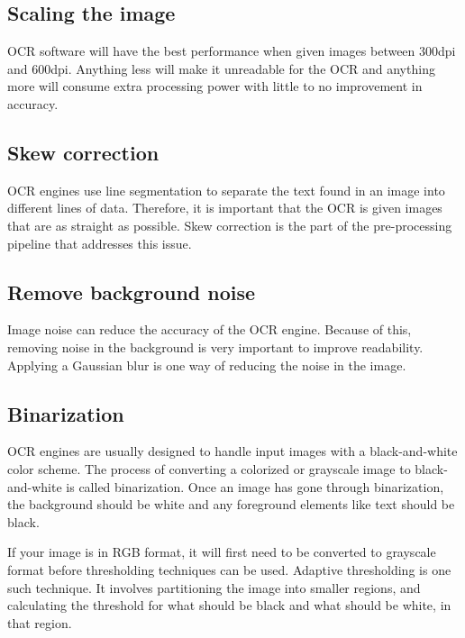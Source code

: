\subsection{Scaling the image}\label{subsec:scaling-the-image}
OCR software will have the best performance when given images between 300dpi and 600dpi.
Anything less will make it unreadable for the OCR and anything more will consume extra processing power with little to no improvement in accuracy.

\subsection{Skew correction}\label{subsec:skew-correction}
OCR engines use line segmentation to separate the text found in an image into different lines of data.
Therefore, it is important that the OCR is given images that are as straight as possible.
Skew correction is the part of the pre-processing pipeline that addresses this issue.

\subsection{Remove background noise}\label{subsec:remove-background-noise}
Image noise can reduce the accuracy of the OCR engine.
Because of this, removing noise in the background is very important to improve readability.
Applying a Gaussian blur is one way of reducing the noise in the image.

\subsection{Binarization}\label{subsec:how-to-create-contrast}
OCR engines are usually designed to handle input images with a black-and-white color scheme.
The process of converting a colorized or grayscale image to black-and-white is called binarization.
Once an image has gone through binarization, the background should be white and any foreground elements like text should be black.

If your image is in RGB format, it will first need to be converted to grayscale format before thresholding techniques can be used.
Adaptive thresholding is one such technique.
It involves partitioning the image into smaller regions, and calculating the threshold for what should be black and what should be white, in that region.

